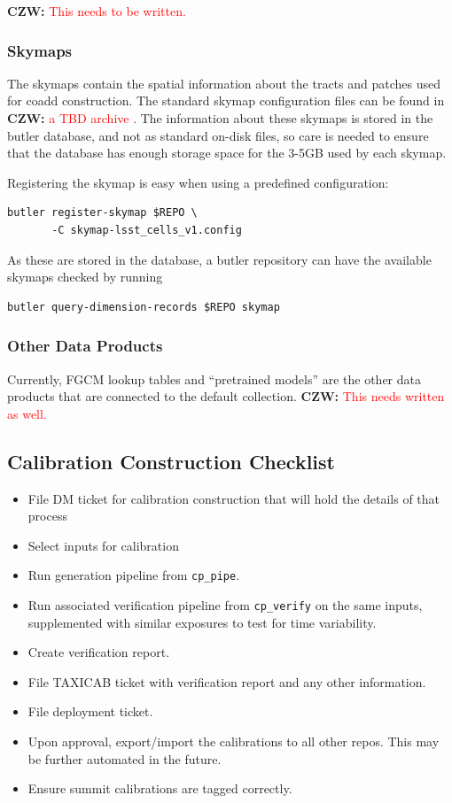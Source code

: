 \documentclass[DM,authoryear,toc]{lsstdoc}
\newcommand{\czw}[1]{
  \textbf{CZW: }\textcolor{red}{#1}
}
\begin{document}
\czw{This needs to be written.}

\subsubsection{Skymaps}

The skymaps contain the spatial information about the tracts and patches used for coadd construction.
The standard skymap configuration files can be found in \czw{a TBD archive}.
The information about these skymaps is stored in the butler database, and not as standard on-disk files, so care is needed to ensure that the database has enough storage space for the 3-5GB used by each skymap.

Registering the skymap is easy when using a predefined configuration:
\begin{verbatim}
butler register-skymap $REPO \
       -C skymap-lsst_cells_v1.config
\end{verbatim}

As these are stored in the database, a butler repository can have the available skymaps checked by running
\begin{verbatim}
butler query-dimension-records $REPO skymap
\end{verbatim}

\subsubsection{Other Data Products}

Currently, FGCM lookup tables and ``pretrained models'' are the other data products that are connected to the default collection.  \czw{This needs written as well.}

\subsection{Calibration Construction Checklist}
\begin{itemize}
\item File DM ticket for calibration construction that will hold the details of that process
\item Select inputs for calibration
\item Run generation pipeline from \verb|cp_pipe|.
\item Run associated verification pipeline from \verb|cp_verify| on the same inputs, supplemented with similar exposures to test for time variability.
\item Create verification report.
\item File TAXICAB ticket with verification report and any other information.
\item File deployment ticket.
\item Upon approval, export/import the calibrations to all other repos.  This may be further automated in the future.
\item Ensure summit calibrations are tagged correctly.
\end{itemize}
\end{document}
